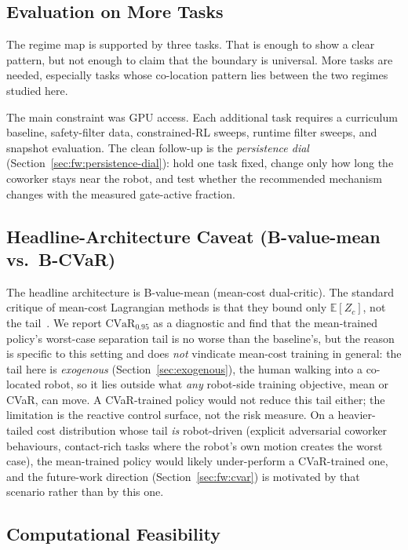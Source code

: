 \documentclass[11pt,a4paper]{report}
\newcommand{\cvar}{\ensuremath{\mathrm{CVaR}}}
\begin{document}
\subsection{Evaluation on More Tasks}
\label{sec:disc:regime-threat}

The regime map is supported by three tasks. That is enough to show a
clear pattern, but not enough to claim that the boundary is universal.
More tasks are needed, especially tasks whose co-location pattern lies
between the two regimes studied here.

The main constraint was GPU access. Each additional task requires a
curriculum baseline, safety-filter data, constrained-RL sweeps, runtime
filter sweeps, and snapshot evaluation. The clean follow-up is the
\emph{persistence dial} (Section~\ref{sec:fw:persistence-dial}): hold
one task fixed, change only how long the coworker stays near the robot,
and test whether the recommended mechanism changes with the measured
gate-active fraction.

\subsection{Headline-Architecture Caveat (B-value-mean vs.\ B-CVaR)}
\label{sec:disc:arch-caveat}

The headline architecture is B-value-mean (mean-cost dual-critic).
The standard critique of mean-cost Lagrangian methods is that they
bound only $\mathbb{E}[Z_c]$, not the tail~\cite{yang2021wcsac}. We
report $\cvar_{0.95}$ as a diagnostic and find that the mean-trained
policy's worst-case separation tail is no worse than the baseline's,
but the reason is specific to this setting and does \emph{not} vindicate
mean-cost training in general: the tail here is \emph{exogenous}
(Section~\ref{sec:exogenous}), the human walking into a co-located
robot, so it lies outside what \emph{any} robot-side training
objective, mean or CVaR, can move. A CVaR-trained policy would not
reduce this tail either; the limitation is the reactive control
surface, not the risk measure. On a heavier-tailed cost distribution
whose tail \emph{is} robot-driven (explicit adversarial coworker
behaviours, contact-rich tasks where the robot's own motion creates
the worst case), the mean-trained policy would likely under-perform a
CVaR-trained one, and the future-work direction
(Section~\ref{sec:fw:cvar}) is motivated by that scenario rather than
by this one.

\subsection{Computational Feasibility}
\label{sec:disc:compute}
\end{document}
